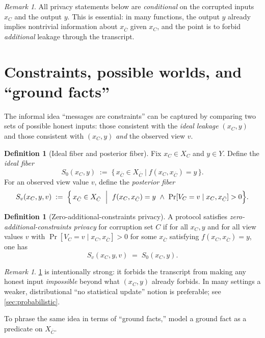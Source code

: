 \documentclass[11pt,a4paper]{article}
\theoremstyle{definition}
\newtheorem{definition}[theorem]{Definition}
\theoremstyle{remark}
\newtheorem{remark}[theorem]{Remark}
\begin{document}
\begin{remark}
\label{rem:view-conditioning}
All privacy statements below are \emph{conditional} on the corrupted inputs $x_C$ and the output $y$. This is essential: in many functions, the output $y$ already implies nontrivial information about $x_{\bar C}$ given $x_C$, and the point is to forbid \emph{additional} leakage through the transcript.
\end{remark}

\section{Constraints, possible worlds, and ``ground facts''}
\label{sec:constraints}

The informal idea ``messages are constraints'' can be captured by comparing two sets of possible honest inputs: those consistent with the \emph{ideal leakage} $(x_C,y)$ and those consistent with $(x_C,y)$ \emph{and} the observed view $v$.

\begin{definition}[Ideal fiber and posterior fiber]
\label{def:fibers}
Fix $x_C\in X_C$ and $y\in Y$. Define the \emph{ideal fiber}
\[
S_0(x_C,y) \;:=\; \{\,x_{\bar C}\in X_{\bar C} \mid f(x_C,x_{\bar C})=y\,\}.
\]
For an observed view value $v$, define the \emph{posterior fiber}
\[
S_v(x_C,y,v) \;:=\; \Bigl\{\,x_{\bar C}\in X_{\bar C} \ \Bigm|\ f(x_C,x_{\bar C})=y \ \wedge\  \Pr[V_C=v\mid x_C,x_{\bar C}]>0 \Bigr\}.
\]
\end{definition}

\begin{definition}[Zero-additional-constraints privacy]
\label{def:zac}
A protocol satisfies \emph{zero-additional-constraints privacy} for corruption set $C$ if for all $x_C,y$ and for all view values $v$ with $\Pr[V_C=v\mid x_C,x_{\bar C}]>0$ for some $x_{\bar C}$ satisfying $f(x_C,x_{\bar C})=y$, one has
\[
S_v(x_C,y,v) \;=\; S_0(x_C,y).
\]
\end{definition}

\begin{remark}
\label{rem:zac-strong}
\cref{def:zac} is intentionally strong: it forbids the transcript from making any honest input \emph{impossible} beyond what $(x_C,y)$ already forbids. In many settings a weaker, distributional ``no statistical update'' notion is preferable; see \cref{sec:probabilistic}.
\end{remark}

To phrase the same idea in terms of ``ground facts,'' model a ground fact as a predicate on $X_{\bar C}$.
\end{document}
